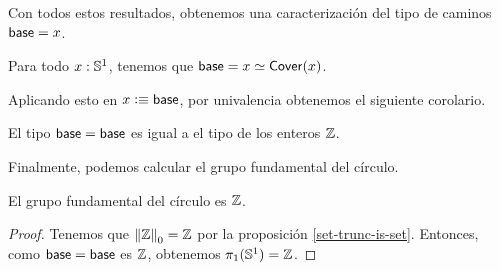 \documentclass[../main.tex]{subfiles}
\begin{document}
Con todos estos resultados, obtenemos una caracterizaci\'on del tipo de caminos $\mathsf{base}=x$.
\begin{proposition}
  Para todo $x: \mathbb{S}^1$, tenemos que $\mathsf{base} = x \simeq \mathsf{Cover}(x)$.
\end{proposition}

Aplicando esto en $x \vcentcolon\equiv \mathsf{base}$, por univalencia obtenemos el siguiente corolario.
\begin{corollary}
  El tipo $\mathsf{base} = \mathsf{base}$ es igual a el tipo de los enteros $\mathbb{Z}$.
\end{corollary}

Finalmente, podemos calcular el grupo fundamental del c\'irculo.

\begin{corollary}
  El grupo fundamental del c\'irculo es $\mathbb{Z}$.
\end{corollary}
\begin{proof}
  Tenemos que $\mathopen{}\left\Vert \mathbb{Z}\right\Vert_{0}\mathclose{} = \mathbb{Z}$ por la proposici\'on \ref{set-trunc-is-set}.
  Entonces, como $\mathsf{base} = \mathsf{base}$ es $\mathbb{Z}$, obtenemos $\pi_1(\mathbb{S}^1)=\mathbb{Z}$.
\end{proof}
\end{document}
